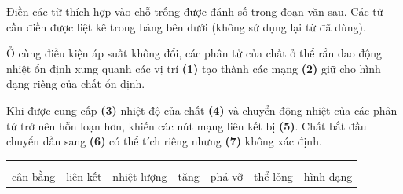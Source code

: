 \begin{ex}
	Điền các từ thích hợp vào chỗ trống được đánh số trong đoạn văn sau. Các từ cần điền được liệt kê trong bảng bên dưới (không sử dụng lại từ đã dùng).
	
	Ở cùng điều kiện áp suất không đổi, các phân tử của chất ở thể rắn dao động nhiệt ổn định xung quanh các vị trí \textbf{(1)} tạo thành các mạng \textbf{(2)} giữ cho hình dạng riêng của chất ổn định.
	
	Khi được cung cấp \textbf{(3)} nhiệt độ của chất \textbf{(4)} và chuyển động nhiệt của các phân tử trở nên hỗn loạn hơn, khiến các nút mạng liên kết bị \textbf{(5)}. Chất bắt đầu chuyển dần sang \textbf{(6)} có thể tích riêng nhưng \textbf{(7)} không xác định.
	
\begin{center}
	\renewcommand{\arraystretch}{1.3}
	\begin{tabular}{|c|c|c|c|c|c|c|}
		\hline
		\textbf{} & \textbf{} & \textbf{} & \textbf{} & \textbf{} & \textbf{} & \textbf{} \\
		\hline
		cân bằng & liên kết & nhiệt lượng & tăng & phá vỡ & thể lỏng & hình dạng \\
		\hline
	\end{tabular}
\end{center}

	
\end{ex}
